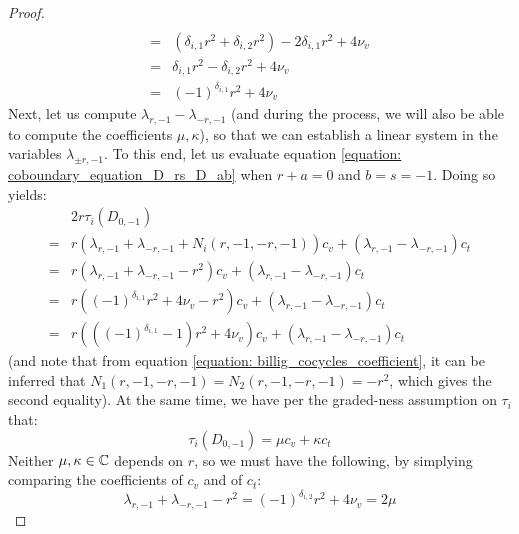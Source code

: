 \begin{proof}
$$\begin{aligned}
                            \\
                            = & ( \delta_{i, 1} r^2 + \delta_{i, 2} r^2 ) - 2\delta_{i, 1} r^2 + 4\nu_v
                            \\
                            = & \delta_{i, 1} r^2 - \delta_{i, 2} r^2 + 4\nu_v
                            \\
                            = & (-1)^{\delta_{i, 1}} r^2 + 4\nu_v
                        \end{aligned}
                    $$
                Next, let us compute $\lambda_{r, -1} - \lambda_{-r, -1}$ (and during the process, we will also be able to compute the coefficients $\mu, \kappa$), so that we can establish a linear system in the variables $\lambda_{\pm r, -1}$. To this end, let us evaluate equation \eqref{equation: coboundary_equation_D_rs_D_ab} when $r + a = 0$ and $b = s = -1$. Doing so yields:
                    $$
                        \begin{aligned}
                            & 2r \tau_i(D_{0, -1})
                            \\
                            = & r\left( \lambda_{r, -1} + \lambda_{-r, -1} + N_i(r, -1, -r, -1) \right) c_v + \left( \lambda_{r, -1} - \lambda_{-r, -1} \right) c_t
                            \\
                            = & r\left( \lambda_{r, -1} + \lambda_{-r, -1} - r^2 \right) c_v + \left( \lambda_{r, -1} - \lambda_{-r, -1} \right) c_t
                            \\
                            = & r\left( (-1)^{\delta_{i, 1}} r^2 + 4\nu_v - r^2 \right) c_v + \left( \lambda_{r, -1} - \lambda_{-r, -1} \right) c_t
                            \\
                            = & r\left( ((-1)^{\delta_{i, 1}} - 1) r^2 + 4\nu_v \right) c_v + \left( \lambda_{r, -1} - \lambda_{-r, -1} \right) c_t
                        \end{aligned}
                    $$
                (and note that from equation \eqref{equation: billig_cocycles_coefficient}, it can be inferred that $N_1(r, -1, -r, -1) = N_2(r, -1, -r, -1) = -r^2$, which gives the second equality). At the same time, we have per the graded-ness assumption on $\tau_i$ that:
                    $$\tau_i(D_{0, -1}) = \mu c_v + \kappa c_t$$
                Neither $\mu, \kappa \in \mathbb{C}$ depends on $r$, so we must have the following, by simplying comparing the coefficients of $c_v$ and of $c_t$:
                    $$\lambda_{r, -1} + \lambda_{-r, -1} - r^2 = (-1)^{\delta_{i, 2}} r^2 + 4\nu_v = 2\mu$$

\end{proof}
